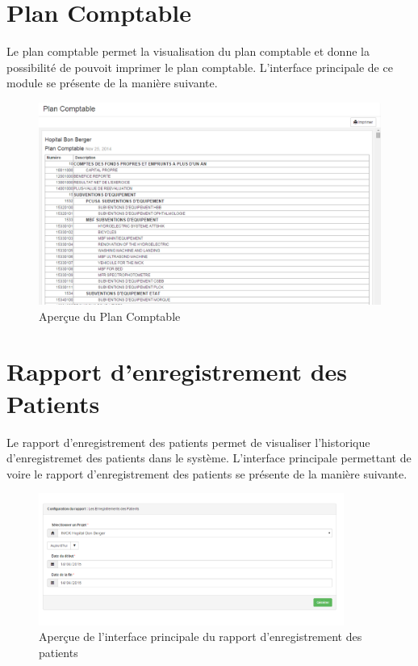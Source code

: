 \documentclass[12pt,a4paper]{report}
\begin{document}
\newpage
\section{Plan Comptable}
Le plan comptable permet la visualisation du plan comptable et donne la possibilité de pouvoit imprimer le plan comptable. L'interface principale de ce module se présente de la manière suivante. 

\begin{figure}[h]
\begin{center}
\includegraphics[width=14cm]{pic/PlanComptableAf.png}
\end{center}
\caption{Aperçue du Plan Comptable}
\label{Aperçue du Plan Comptable}
\end{figure}

\newpage
\section{Rapport d'enregistrement des Patients}
Le rapport d'enregistrement des patients permet de visualiser l'historique d'enregistremet des patients dans le système. L'interface principale permettant de voire le rapport d'enregistrement des patients se présente de la manière suivante. 

\begin{figure}[h]
\begin{center}
\includegraphics[width=10cm]{pic/RapportEnrPatient.png}
\end{center}
\caption{Aperçue de l'interface principale du rapport d'enregistrement des patients}
\label{Aperçue de l'interface principale du rapport d'enregistrement des patients}
\end{figure}
\end{document}
